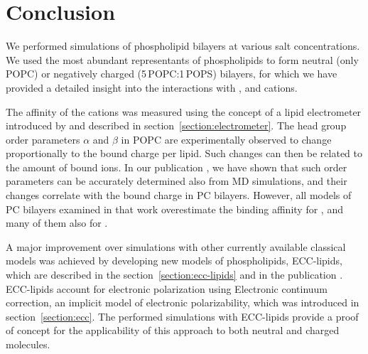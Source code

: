 \chapter*{Conclusion}

We performed simulations of phospholipid bilayers at various salt concentrations. 
We used the most abundant representants of phospholipids
to form neutral (only POPC) or negatively charged (5\,POPC:1\,POPS) bilayers, 
for which we have provided a detailed insight 
into the interactions with 
,  and  cations. 

The affinity of the cations 
was measured using the concept of a lipid electrometer 
introduced by \citet{seelig87} 
and described in section~\ref{section:electrometer}.
The head group order parameters $\alpha$ and $\beta$ in POPC
are experimentally observed to change
proportionally to the bound charge per lipid. 
Such changes can then be related to the amount of bound ions.
In our publication \citep{catte16},
we have shown that such order parameters can be accurately determined also from MD simulations,
and their changes correlate with the bound charge in PC bilayers. 
However, all models of PC bilayers examined in that work
overestimate the binding affinity for , 
and many of them also for . 

A major improvement over simulations with other currently available classical models
was achieved by developing new models of phospholipids, 
ECC-lipids,
which are described in the section~\ref{section:ecc-lipids}
and in the publication \citep{melcr18}. 
ECC-lipids account for electronic polarization
using Electronic continuum correction,  
an implicit model of electronic polarizability, 
which was introduced in section~\ref{section:ecc}. 
The performed simulations with ECC-lipids 
provide a proof of concept for the applicability of this approach 
to both neutral and charged molecules. 


